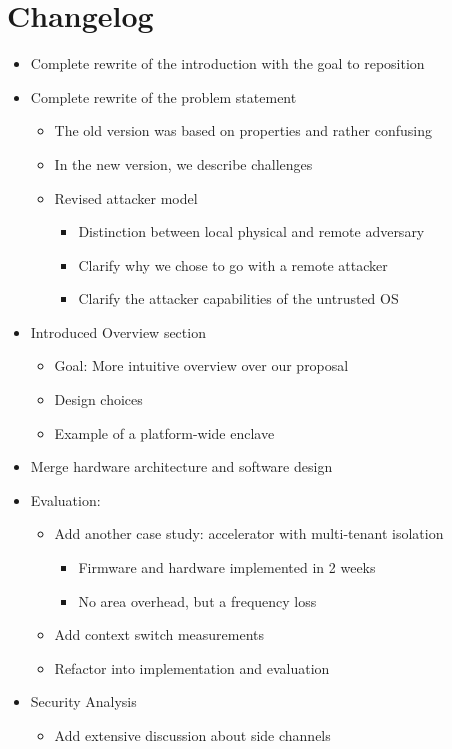 \documentclass[9pt]{article}
\begin{document}
\section{Changelog}
\begin{itemize}
  \item Complete rewrite of the introduction with the goal to reposition
  \item Complete rewrite of the problem statement
  \begin{itemize}
    \item The old version was based on properties and rather confusing
    \item In the new version, we describe challenges
    \item Revised attacker model
    \begin{itemize}
      \item Distinction between local physical and remote adversary
      \item Clarify why we chose to go with a remote attacker
      \item Clarify the attacker capabilities of the untrusted OS
    \end{itemize}
  \end{itemize}
  \item Introduced Overview section
  \begin{itemize}
    \item Goal: More intuitive overview over our proposal
    \item Design choices
    \item Example of a platform-wide enclave
  \end{itemize}
  \item Merge hardware architecture and software design
  \item Evaluation:
  \begin{itemize}
    \item Add another case study: accelerator with multi-tenant isolation
    \begin{itemize}
      \item Firmware and hardware implemented in 2 weeks
      \item No area overhead, but a frequency loss
    \end{itemize}
    \item Add context switch measurements
    \item Refactor into implementation and evaluation
  \end{itemize}
  \item Security Analysis
  \begin{itemize}
    \item Add extensive discussion about side channels
  \end{itemize} 
\end{itemize}
\pagebreak
\end{document}
